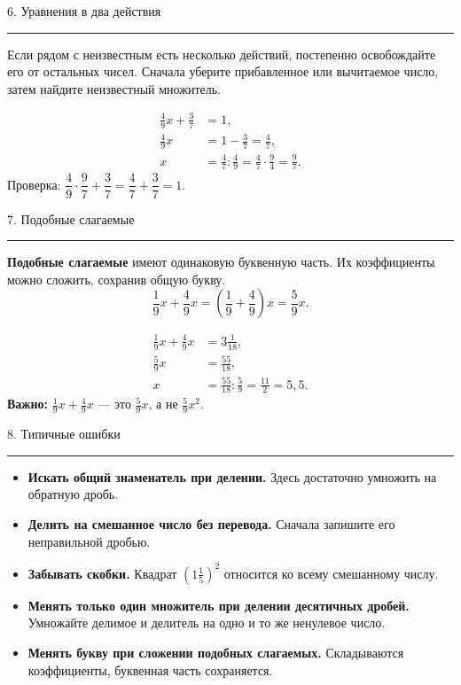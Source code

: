 \documentclass[a4paper,12pt]{article}
\newcommand{\sect}[1]{%
  \vspace{5pt}%
  {\Large\color{darkaccent}#1\par}%
  \vspace{2pt}%
  {\color{accent}\rule{\linewidth}{0.55pt}\par}%
  \vspace{5pt}%
}
\newcommand{\minititle}[1]{\par\Needspace{5\baselineskip}\vspace{2pt}{\color{darkaccent}\bfseries #1}\par\vspace{2pt}}
\newcommand{\important}[1]{{\color{darkaccent}\bfseries #1}}
\begin{document}
\sect{6. Уравнения в два действия}
Если рядом с неизвестным есть несколько действий, постепенно освобождайте его от остальных чисел. Сначала уберите прибавленное или вычитаемое число, затем найдите неизвестный множитель.
\minititle{Пример 5}
\[
\begin{aligned}
\frac49x+\frac37&=1,\\
\frac49x&=1-\frac37=\frac47,\\
x&=\frac47:\frac49=\frac47\cdot\frac94=\boxed{\frac97}.
\end{aligned}
\]
Проверка: $\dfrac49\cdot\dfrac97+\dfrac37=\dfrac47+\dfrac37=1$.

\sect{7. Подобные слагаемые}
\important{Подобные слагаемые} имеют одинаковую буквенную часть. Их коэффициенты можно сложить, сохранив общую букву.
\[
\frac19x+\frac49x=\left(\frac19+\frac49\right)x=\frac59x.
\]
\minititle{Пример 6}
\[
\begin{aligned}
\frac19x+\frac49x&=3\frac1{18},\\
\frac59x&=\frac{55}{18},\\
x&=\frac{55}{18}:\frac59=\boxed{\frac{11}{2}=5,5}.
\end{aligned}
\]
\important{Важно:} $\frac19x+\frac49x$ --- это $\frac59x$, а не $\frac59x^2$.

\sect{8. Типичные ошибки}
\begin{itemize}
\item \textbf{Искать общий знаменатель при делении.} Здесь достаточно умножить на обратную дробь.
\item \textbf{Делить на смешанное число без перевода.} Сначала запишите его неправильной дробью.
\item \textbf{Забывать скобки.} Квадрат $\left(1\frac15\right)^2$ относится ко всему смешанному числу.
\item \textbf{Менять только один множитель при делении десятичных дробей.} Умножайте делимое и делитель на одно и то же ненулевое число.
\item \textbf{Менять букву при сложении подобных слагаемых.} Складываются коэффициенты, буквенная часть сохраняется.
\end{itemize}
\end{document}

